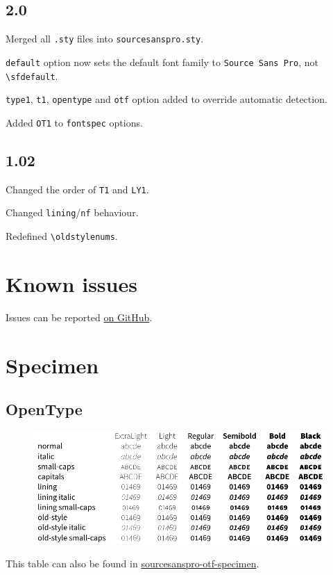 \documentclass[10pt,a4paper,english]{article}
\newcommand*\file[1]{\href{run:#1.pdf}{#1}}
\begin{document}
\begin{multicols}{2}
\subsection*{2.0}
\begin{itemize*}
	\item Merged all \texttt{.sty} files into \texttt{sourcesanspro.sty}.
	\item \texttt{default} option now sets the default font family to \texttt{Source Sans Pro}, not \texttt{\textbackslash sfdefault}.
	\item \texttt{type1}, \texttt{t1}, \texttt{opentype} and \texttt{otf} option added to override automatic detection.
	\item Added \texttt{OT1} to \texttt{fontspec} options.
\end{itemize*}

\subsection*{1.02}
\begin{itemize*}
	\item Changed the order of \texttt{T1} and \texttt{LY1}.
	\item Changed \texttt{lining}/\texttt{nf} behaviour.
	\item Redefined \texttt{\textbackslash oldstylenums}.
\end{itemize*}

\section{Known issues}
Issues can be reported \href{https://github.com/silkeh/latex-sourcesanspro/issues}{on GitHub}.

\newpage
\end{multicols}

\section{Specimen}
\label{sec:specimen}
\subsection{OpenType}
\begin{figure}[ht]
	\centering
	\includegraphics{sourcesanspro-otf-specimen}
\end{figure}
This table can also be found in \file{sourcesanspro-otf-specimen}.
\end{document}
